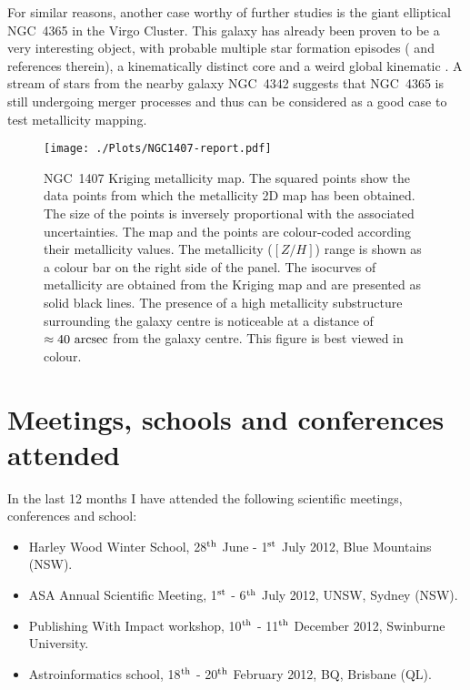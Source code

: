   For similar reasons, another case worthy of further studies is the giant elliptical NGC~4365 in the Virgo Cluster. 
  This galaxy has already been proven to be a very interesting object, with probable multiple star formation episodes (\citealt{Blom12} 
  and references therein), a kinematically distinct core and a weird global kinematic \citep{Davies01}. 
  A stream of stars from the nearby galaxy NGC~4342 \citep{Blom13} suggests that NGC~4365 is still undergoing 
  merger processes and thus can be considered as a good case to test metallicity mapping. 


	\begin{figure}
    	\begin{center}
			\texttt{[image: ./Plots/NGC1407-report.pdf]}
		\end{center}
	    \caption[]{NGC~1407 Kriging metallicity map. 
				The squared points show the data points from which the metallicity 2D map 
				has been obtained. 
				The size of the points is inversely proportional with the associated uncertainties. 
				The map and the points are colour-coded according their metallicity values. 
				The metallicity ($[Z/H]$) range is shown as a colour bar on the right side of the panel. 
				The isocurves of metallicity are obtained from the Kriging map and are presented as solid black lines. 
				The presence of a high metallicity substructure surrounding the galaxy centre is noticeable at a distance 
				of $\approx 40~\rm{arcsec}$ from the galaxy centre. 
			   	This figure is best viewed in colour. 
			   	}
    \label{fig:N1407}
  \end{figure}
	



\section{Meetings, schools and conferences attended}
	In the last 12 months I have attended the following scientific meetings, conferences and school:
	\begin{itemize}
		\item{Harley Wood Winter School}, 28$^{\rm{th}}$ June - 1$^{\rm{st}}$ July 2012, Blue Mountains (NSW).
		\item{ASA Annual Scientific Meeting}, 1$^{\rm{st}}$ - 6$^{\rm{th}}$ July 2012, UNSW, Sydney (NSW).
		\item{Publishing With Impact workshop}, 10$^{\rm{th}}$ - 11$^{\rm{th}}$ December 2012, Swinburne University.
		\item{Astroinformatics school}, 18$^{\rm{th}}$ - 20$^{\rm{th}}$ February 2012, BQ, Brisbane (QL).  
	\end{itemize}
	
